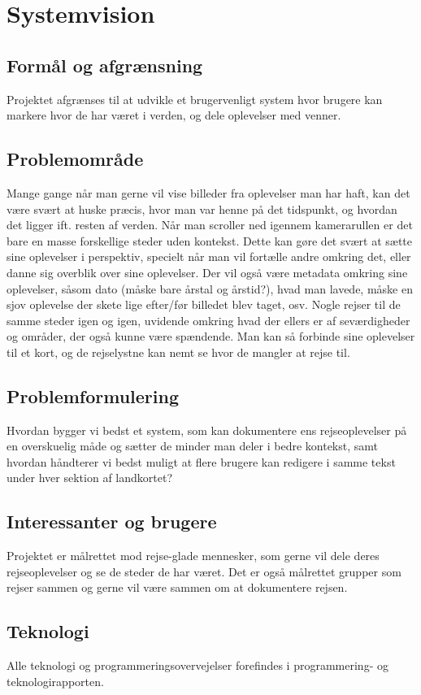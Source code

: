 \chapter{Systemvision}\label{ch:systemvision}

\section{Formål og afgrænsning}\label{sec:purpose}
Projektet afgrænses til at udvikle et brugervenligt system hvor brugere kan markere hvor de har været i verden, og dele oplevelser med venner.

\section{Problemområde}\label{sec:problemarea}
Mange gange når man gerne vil vise billeder fra oplevelser man har haft, kan det være svært at huske præcis, hvor man var henne på det tidspunkt, og hvordan det ligger ift. resten af verden. Når man scroller ned igennem kamerarullen er det bare en masse forskellige steder uden kontekst. Dette kan gøre det svært at sætte sine oplevelser i perspektiv, specielt når man vil fortælle andre omkring det, eller danne sig overblik over sine oplevelser. Der vil også være metadata omkring sine oplevelser, såsom dato (måske bare årstal og årstid?), hvad man lavede, måske en sjov oplevelse der skete lige efter/før billedet blev taget, osv. Nogle rejser til de samme steder igen og igen, uvidende omkring hvad der ellers er af seværdigheder og områder, der også kunne være spændende. Man kan så forbinde sine oplevelser til et kort, og de rejselystne kan nemt se hvor de mangler at rejse til.

\section{Problemformulering}\label{sec:problemstatement}
Hvordan bygger vi bedst et system, som kan dokumentere ens rejseoplevelser på en overskuelig måde og sætter de minder man deler i bedre kontekst, samt hvordan håndterer vi bedst muligt at flere brugere kan redigere i samme tekst under hver sektion af landkortet?

\section{Interessanter og brugere}\label{sec:users}
Projektet er målrettet mod rejse-glade mennesker, som gerne vil dele deres rejseoplevelser og se de steder de har været. Det er også målrettet grupper som rejser sammen og gerne vil være sammen om at dokumentere rejsen.

\section{Teknologi}\label{sec:technology}
Alle teknologi og programmeringsovervejelser forefindes i programmering- og teknologirapporten.